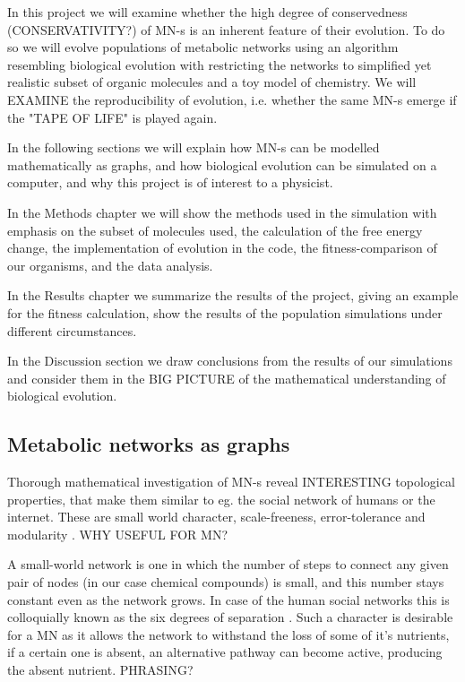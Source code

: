 \documentclass[10pt,a4paper]{article}
\begin{document}
	In this project we will examine whether the high degree of conservedness (CONSERVATIVITY?) of MN-s is an inherent feature of their evolution. To do so we will evolve populations of metabolic networks using an algorithm resembling biological evolution with restricting the networks to simplified yet realistic subset of organic molecules and a toy model of chemistry. We will EXAMINE the reproducibility of evolution, i.e. whether the same MN-s emerge if the "TAPE OF LIFE" is played again. 

	In the following sections we will explain how MN-s can be modelled mathematically as graphs, and how biological evolution can be simulated on a computer, and why this project is of interest to a physicist.

	In the Methods chapter we  will show the methods used in the simulation with emphasis on the subset of molecules used, the calculation of the free energy change, the implementation of evolution in the code, the fitness-comparison of our organisms, and the data analysis. 

	In the Results chapter we summarize the results of the project, giving an example for the fitness calculation, show the results of the population simulations under different circumstances.


	In the Discussion section we draw conclusions from the results of our simulations and consider them in the BIG PICTURE of the mathematical understanding of biological evolution. 

	
	\subsection{Metabolic networks as graphs}
	Thorough mathematical investigation of MN-s reveal INTERESTING topological properties, that make them similar to eg. the social network of humans or the internet. These are small world character, scale-freeness, error-tolerance \cite{largescale} and modularity . WHY USEFUL FOR MN?
	
	A small-world network \cite{smallworld} is one in which the number of steps to connect any given pair of nodes (in our case chemical compounds) is small, and this number stays constant even as the network grows. In case of the human social networks this is colloquially known as the six degrees of separation \cite{sixdegrees}. Such a character is desirable for a MN as it allows the network to withstand the loss of some of it's nutrients, if a certain one is absent, an alternative pathway can become active, producing the absent nutrient. PHRASING? 
	 
\end{document}
